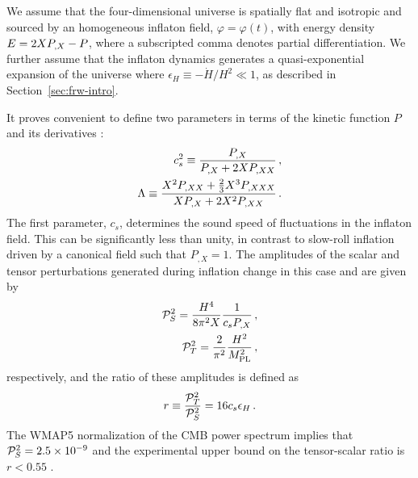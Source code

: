 We assume that the four-dimensional universe is   
spatially flat and isotropic and sourced by an  
homogeneous inflaton field, $\varphi =\varphi (t)$, with energy 
density $E = 2XP_{,X} - P$, where a subscripted comma denotes partial
differentiation. 
We further assume that the inflaton dynamics  
generates a quasi-exponential expansion of the universe 
where $\epsilon_H \equiv -\dot{H}/H^2 \ll1$,
as described in Section~\ref{sec:frw-intro}. 


It proves convenient to define two parameters in terms of the 
kinetic  function $P$ and its derivatives \cite{lidser1,lidser3}: 
% 
\begin{eqnarray}
\label{eq:defcs-dbiintro}
 c_s^2 \equiv \frac{P_{,X}}{P_{,X} + 2X P_{,XX}} \,,
\\
\label{eq:deflambda-dbiintro}
\Lambda \equiv  \frac{X^2 P_{,XX} +
\frac{2}{3}X^3 P_{,XXX}}{X P_{,X} +
2X^2 P_{,XX}}\,.
\end{eqnarray}
% 
The first parameter, $c_s$, determines the sound speed of fluctuations 
in the inflaton field. This can be significantly less than unity, 
in contrast to slow-roll inflation driven by a canonical 
field such that $P_{,X} =1$.
The amplitudes of the scalar and tensor perturbations 
generated during inflation change in this case and are given by \cite{gm}
% 
\begin{eqnarray} 
\label{eq:Ps-dbiintro}
 \mathcal{P}_S^2 = \frac{H^4}{8\pi^2 X}\frac{1}{c_s P_{,X}} \,,
\\
\label{eq:Pt-dbiintro}
\mathcal{P}_T^2 = \frac{2}{\pi^2} \frac{H^2}{M_{\mathrm{PL}}^2} \,,
\end{eqnarray}
% 
respectively, and the ratio of these amplitudes 
is defined as \cite{gm} 
% 
\begin{equation}
\label{eq:rdefn-dbiintro}
r\equiv \frac{\mathcal{P}_T^2}{\mathcal{P}_S^2} = 16c_s \epsilon_H \,.
\end{equation}
%   
The WMAP5 normalization of the CMB power spectrum 
implies that $\mathcal{P}_S^2= 2.5\times10^{-9}$ and 
the experimental upper bound on the tensor-scalar 
ratio is $r <0.55$ \cite{Komatsu:2008hk}.

